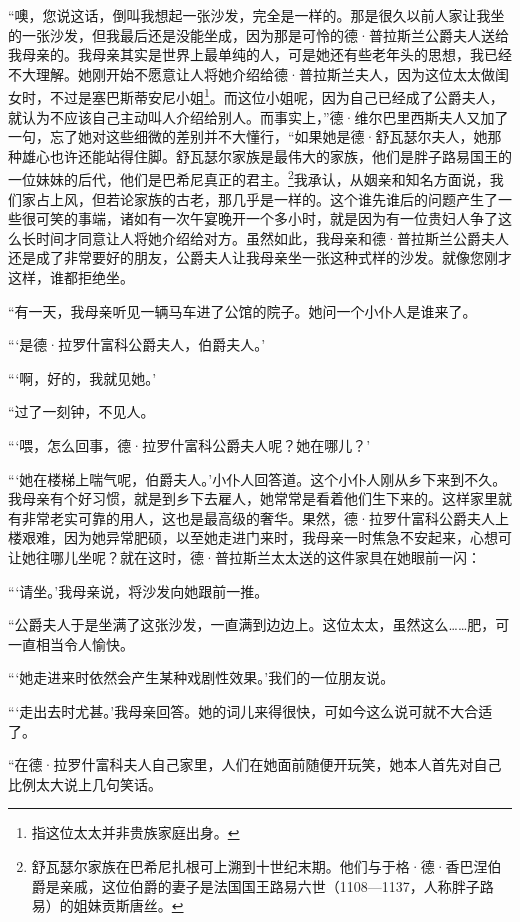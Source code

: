 \par “噢，您说这话，倒叫我想起一张沙发，完全是一样的。那是很久以前人家让我坐的一张沙发，但我最后还是没能坐成，因为那是可怜的德·普拉斯兰公爵夫人送给我母亲的。我母亲其实是世界上最单纯的人，可是她还有些老年头的思想，我已经不大理解。她刚开始不愿意让人将她介绍给德·普拉斯兰夫人，因为这位太太做闺女时，不过是塞巴斯蒂安尼小姐\footnote{指这位太太并非贵族家庭出身。}。而这位小姐呢，因为自己已经成了公爵夫人，就认为不应该自己主动叫人介绍给别人。而事实上，”德·维尔巴里西斯夫人又加了一句，忘了她对这些细微的差别并不大懂行，“如果她是德·舒瓦瑟尔夫人，她那种雄心也许还能站得住脚。舒瓦瑟尔家族是最伟大的家族，他们是胖子路易国王的一位妹妹的后代，他们是巴希尼真正的君主。\footnote{舒瓦瑟尔家族在巴希尼扎根可上溯到十世纪末期。他们与于格·德·香巴涅伯爵是亲戚，这位伯爵的妻子是法国国王路易六世（1108—1137，人称胖子路易）的姐妹贡斯唐丝。}我承认，从姻亲和知名方面说，我们家占上风，但若论家族的古老，那几乎是一样的。这个谁先谁后的问题产生了一些很可笑的事端，诸如有一次午宴晚开一个多小时，就是因为有一位贵妇人争了这么长时间才同意让人将她介绍给对方。虽然如此，我母亲和德·普拉斯兰公爵夫人还是成了非常要好的朋友，公爵夫人让我母亲坐一张这种式样的沙发。就像您刚才这样，谁都拒绝坐。
\par “有一天，我母亲听见一辆马车进了公馆的院子。她问一个小仆人是谁来了。
\par “‘是德·拉罗什富科公爵夫人，伯爵夫人。’
\par “‘啊，好的，我就见她。’
\par “过了一刻钟，不见人。
\par “‘喂，怎么回事，德·拉罗什富科公爵夫人呢？她在哪儿？’
\par “‘她在楼梯上喘气呢，伯爵夫人。’小仆人回答道。这个小仆人刚从乡下来到不久。我母亲有个好习惯，就是到乡下去雇人，她常常是看着他们生下来的。这样家里就有非常老实可靠的用人，这也是最高级的奢华。果然，德·拉罗什富科公爵夫人上楼艰难，因为她异常肥硕，以至她走进门来时，我母亲一时焦急不安起来，心想可让她往哪儿坐呢？就在这时，德·普拉斯兰太太送的这件家具在她眼前一闪：
\par “‘请坐。’我母亲说，将沙发向她跟前一推。
\par “公爵夫人于是坐满了这张沙发，一直满到边边上。这位太太，虽然这么……肥，可一直相当令人愉快。
\par “‘她走进来时依然会产生某种戏剧性效果。’我们的一位朋友说。
\par “‘走出去时尤甚。’我母亲回答。她的词儿来得很快，可如今这么说可就不大合适了。
\par “在德·拉罗什富科夫人自己家里，人们在她面前随便开玩笑，她本人首先对自己比例太大说上几句笑话。
